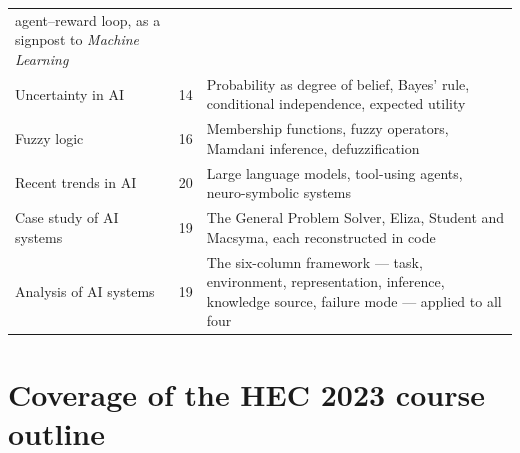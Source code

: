 \begin{longtable}{@{}L{6.4cm}L{2.0cm}L{6.6cm}@{}}
agent--reward loop, as a signpost to \emph{Machine Learning} \\
Uncertainty in AI & 14 & Probability as degree of belief, Bayes' rule,
conditional independence, expected utility \\
Fuzzy logic & 16 & Membership functions, fuzzy operators, Mamdani inference,
defuzzification \\
Recent trends in AI & 20 & Large language models, tool-using agents,
neuro-symbolic systems \\
Case study of AI systems & 19 & The General Problem Solver, Eliza, Student and
Macsyma, each reconstructed in code \\
Analysis of AI systems & 19 & The six-column framework --- task, environment,
representation, inference, knowledge source, failure mode --- applied to all
four \\
\bottomrule
\end{longtable}

\section*{Coverage of the HEC 2023 course outline}

